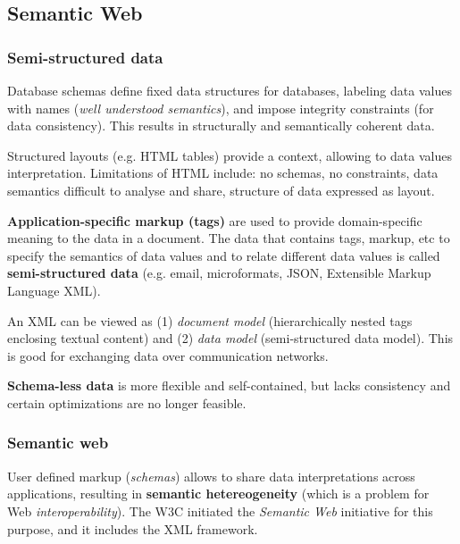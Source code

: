\subsection{Semantic Web} %
\label{sub:semantic_web}

\subsubsection{Semi-structured data} %
\label{ssub:semi_structured_data}
	Database schemas define fixed data structures for databases, labeling data values with names (\emph{well understood semantics}), and impose integrity constraints (for data consistency). This results in structurally and semantically coherent data.

	Structured layouts (e.g. HTML tables) provide a context, allowing to data values interpretation. Limitations of HTML include: no schemas, no constraints, data semantics difficult to analyse and share, structure of data expressed as layout.

	\textbf{Application-specific markup (tags)} are used to provide domain-specific meaning to the data in a document. The data that contains tags, markup, etc to specify the semantics of data values and to relate different data values is called \textbf{semi-structured data} (e.g. email, microformats, JSON, Extensible Markup Language XML).

	An XML can be viewed as (1) \emph{document model} (hierarchically nested tags enclosing textual content) and (2) \emph{data model} (semi-structured data model). This is good for exchanging data over communication networks.

	\textbf{Schema-less data} is more flexible and self-contained, but lacks consistency and certain optimizations are no longer feasible.

\subsubsection{Semantic web} %
\label{ssub:semantic_web}
	User defined markup (\emph{schemas}) allows to share data interpretations across applications, resulting in \textbf{semantic hetereogeneity} (which is a problem for Web \emph{interoperability}). The W3C initiated the \emph{Semantic Web} initiative for this purpose, and it includes the XML framework.

